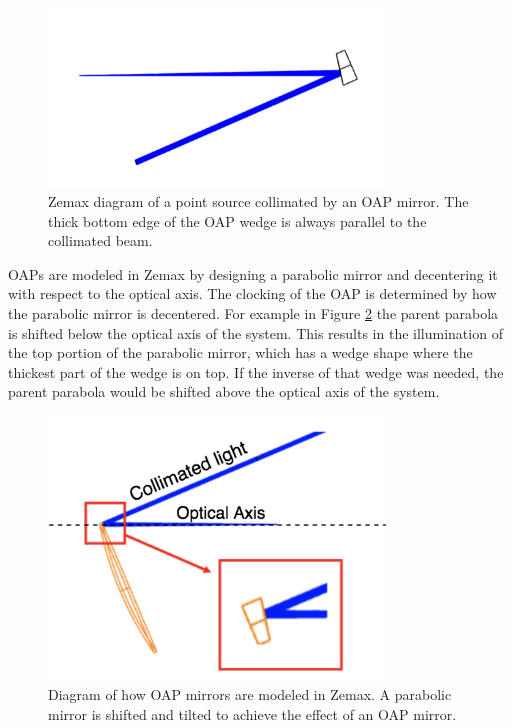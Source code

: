 \begin{figure}
    \centering
    \includegraphics[width=0.8\textwidth]{Chapter Materials/Chapter Five Materials/OAPcollimate.png}
    \caption{Zemax diagram of a point source collimated by an OAP mirror. The thick bottom edge of the OAP wedge is always parallel to the collimated beam. }
    \label{fig:OAPcol}
\end{figure}

OAPs are modeled in Zemax by designing a parabolic mirror and decentering it with respect to the optical axis. The clocking of the OAP is determined by how the parabolic mirror is decentered. For example in Figure \ref{fig:OAPex} the parent parabola is shifted below the optical axis of the system. This results in the illumination of the top portion of the parabolic mirror, which has a wedge shape where the thickest part of the wedge is on top. If the inverse of that wedge was needed, the parent parabola would be shifted above the optical axis of the system. 

\begin{figure}
    \centering
    \includegraphics[width=0.8\textwidth]{Chapter Materials/Chapter Five Materials/OAPexample.png}
    \caption{Diagram of how OAP mirrors are modeled in Zemax. A parabolic mirror is shifted and tilted to achieve the effect of an OAP mirror.}
    \label{fig:OAPex}
\end{figure}

